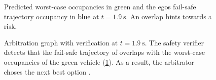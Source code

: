 %
%

\begin{figure}[!t]
    \centering
    
    \caption{
        Predicted worst-case occupancies in green and
        the egos fail-safe trajectory occupancy in blue
        at $t=\SI{1.9}{\second}$.
        An overlap hints towards a risk.
    }
    \label{fig:experiments-safe-occupancies}
\end{figure}

\begin{figure}[!t]
    \centering
    
    \caption{
        Arbitration graph with verification at $t=\SI{1.9}{\second}$.
        The safety verifier detects that the fail-safe trajectory of 
        overlaps with the worst-case occupancies of the green vehicle
        (\cref{fig:experiments-safe-occupancies}).
        As a result, the  arbitrator choses the next best option .
    }
    \label{fig:experiments-safe-arbitration-graph}
\end{figure}